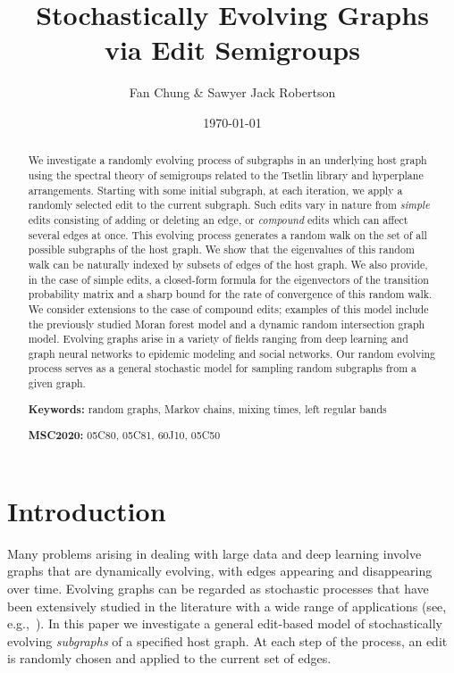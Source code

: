\documentclass[11pt,a4paper]{article}
\title{\vspace{-1.5cm}Stochastically Evolving Graphs\\via Edit Semigroups}
\author{Fan Chung \& Sawyer Jack Robertson}
\date{\today}
\begin{document}
\maketitle

\begin{abstract}
    We investigate a randomly evolving process of subgraphs in an underlying host graph using the spectral theory of semigroups related to the Tsetlin library and hyperplane arrangements. Starting with some initial subgraph, at each iteration, we apply a randomly selected edit to the current subgraph. Such edits vary in nature from \emph{simple} edits consisting of adding or deleting an edge, or \emph{compound} edits which can affect several edges at once. This evolving process generates a random walk on the set of all possible subgraphs of the host graph. We show that the eigenvalues of this random walk can be naturally indexed by subsets of edges of the host graph. We also provide, in the case of simple edits, a closed-form formula for the eigenvectors of the transition probability matrix and a sharp bound for the rate of convergence of this random walk. We consider extensions to the case of compound edits; examples of this model include the previously studied Moran forest model and a dynamic random intersection graph model. Evolving graphs arise in a variety of fields ranging from deep learning and graph neural networks to epidemic modeling and social networks. Our random evolving process serves as a general stochastic model for sampling random subgraphs from a given graph.
    
    \vspace{.25cm}
    {\footnotesize
    {\textbf{Keywords:}} random graphs, Markov chains, mixing times, left regular bands

    {\textbf{MSC2020:}} 05C80, 05C81, 60J10, 05C50
    }
\end{abstract}

\section{Introduction}\label{sec:introduction}

Many problems arising in dealing with large data and deep learning involve graphs that are dynamically evolving, with edges appearing and disappearing over time. Evolving graphs can be regarded as stochastic processes that have been extensively studied in the literature with a wide range of applications (see, e.g.,~\cite{anari2019log,cooper2007sampling}). In this paper we investigate a general edit-based model of stochastically evolving \emph{subgraphs} of a specified host graph. At each step of the process, an edit is randomly chosen and applied to the current set of edges.
\end{document}
